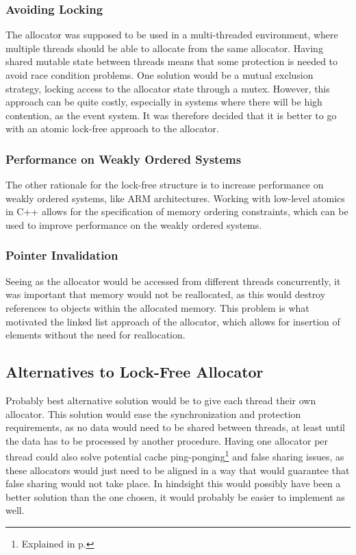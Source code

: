 \subsubsection{Avoiding Locking}
The allocator was supposed to be used in a multi-threaded environment, where multiple threads
should be able to allocate from the same allocator.
Having shared mutable state between threads means that some protection is needed
to avoid race condition problems.
One solution would be a mutual exclusion strategy, locking access to the allocator state through a mutex.
However, this approach can be quite costly, especially in systems where there will be high contention, as the event system.
It was therefore decided that it is better to go with an atomic lock-free approach to the allocator.

\subsubsection{Performance on Weakly Ordered Systems}
The other rationale for the lock-free structure is to increase performance on weakly ordered systems, like ARM architectures\cite{preshing_weak_vs_strong_memory_models}.
Working with low-level atomics in C++ allows for the specification of memory ordering constraints, which can be used to improve performance on the weakly ordered systems.

\subsubsection{Pointer Invalidation}
Seeing as the allocator would be accessed from different threads concurrently, it was important that memory would not be reallocated, as this would destroy references to objects within the allocated memory.
This problem is what motivated the linked list approach of the allocator, which allows for insertion of elements without the need for reallocation.

\subsection{Alternatives to Lock-Free Allocator}
\label{subsubsec:lock_free_allocator_alternatives}
Probably best alternative solution would be to give each thread their own allocator.
This solution would ease the synchronization and protection requirements, as no data would need to be shared between threads, at least until the data has to be processed by another procedure.
Having one allocator per thread could also solve potential cache ping-ponging\footnote{Explained in p.\pageref{par:detailed_lock_free_ping_pong}} and false sharing issues, as these allocators would just need to be aligned in a way that would guarantee that false sharing would not take place.
In hindsight this would possibly have been a better solution than the one chosen, it would probably be easier to implement as well.

